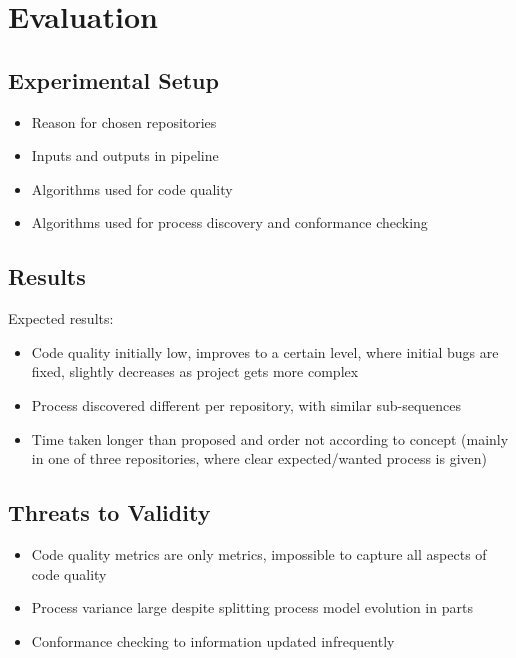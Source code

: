 \chapter{Evaluation}
\label{chap:eval}


\section{Experimental Setup}
\begin{itemize}
	\item Reason for chosen repositories
	\item Inputs and outputs in pipeline
	\item Algorithms used for code quality
	\item Algorithms used for process discovery and conformance checking
\end{itemize}

\section{Results}
Expected results:
\begin{itemize}
	\item Code quality initially low, improves to a certain level, where initial bugs are fixed, slightly decreases as project gets more complex
	\item Process discovered different per repository, with similar sub-sequences
	\item Time taken longer than proposed and order not according to concept (mainly in one of three repositories, where clear expected/wanted process is given)
\end{itemize}

\section{Threats to Validity}
\begin{itemize}
	\item Code quality metrics are only metrics, impossible to capture all aspects of code quality
	\item Process variance large despite splitting process model evolution in parts
	\item Conformance checking to information updated infrequently
\end{itemize}
